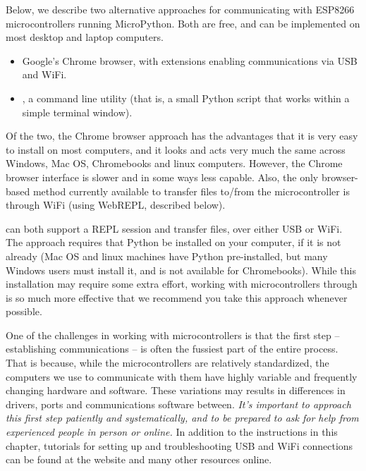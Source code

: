 Below, we describe two alternative approaches for communicating with  ESP8266 microcontrollers running MicroPython. Both are free, and can be implemented on most desktop and laptop computers.
\begin{itemize}
	\item Google's Chrome browser, with extensions enabling communications via USB and WiFi.
	\item \mpfshell, a command line utility (that is, a small Python script that works within a simple terminal window).
\end{itemize}
Of the two, the Chrome browser approach has the advantages that it is very easy to install on most computers, and it looks and acts very much the same across Windows, Mac OS, Chromebooks and linux computers.
However, the Chrome browser interface is slower and in some ways less capable.
Also, the only browser-based method currently available to transfer files to/from the microcontroller is through WiFi (using WebREPL, described below).

\mpfshell can both support a REPL session and transfer files, over either USB or WiFi.
The \mpfshell approach requires that Python be installed on your computer, if it is not already
(Mac OS and linux machines have Python pre-installed, but many Windows users must install it, and \mpfshell is not available for Chromebooks).
While this installation may require some extra effort, working with microcontrollers through \mpfshell is so much more effective that we recommend you take this approach whenever possible.


\begin{kaobox}[frametitle=As you get started \dots]
One of the challenges in working with microcontrollers is that the first step -- establishing communications -- is often the fussiest part of the entire process.
That is because, while the microcontrollers are relatively standardized, the computers we use to communicate with them have highly variable and frequently changing hardware and software.
These variations may results in differences in drivers, ports and communications software between.
\emph{It's important to approach this first step patiently and systematically, and to be prepared to ask for help from experienced people in person or online.}
In addition to the instructions in this chapter, tutorials for setting up and troubleshooting USB and WiFi connections can be found at the  website and many other resources online.
\end{kaobox}


